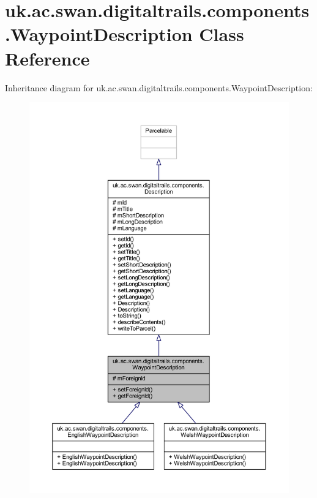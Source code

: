 \hypertarget{classuk_1_1ac_1_1swan_1_1digitaltrails_1_1components_1_1_waypoint_description}{\section{uk.\+ac.\+swan.\+digitaltrails.\+components.\+Waypoint\+Description Class Reference}
\label{classuk_1_1ac_1_1swan_1_1digitaltrails_1_1components_1_1_waypoint_description}
}


Inheritance diagram for uk.\+ac.\+swan.\+digitaltrails.\+components.\+Waypoint\+Description\+:
\nopagebreak
\begin{figure}[H]
\begin{center}
\leavevmode
\includegraphics[width=350pt]{classuk_1_1ac_1_1swan_1_1digitaltrails_1_1components_1_1_waypoint_description__inherit__graph}
\end{center}
\end{figure}


